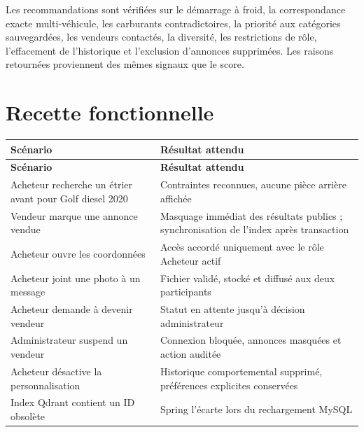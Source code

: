 Les recommandations sont vérifiées sur le démarrage à froid, la correspondance exacte multi-véhicule, les carburants contradictoires, la priorité aux catégories sauvegardées, les vendeurs contactés, la diversité, les restrictions de rôle, l'effacement de l'historique et l'exclusion d'annonces supprimées. Les raisons retournées proviennent des mêmes signaux que le score.


\section{Recette fonctionnelle}

{\small\singlespacing{}
\begin{longtable}{|>{\raggedright\arraybackslash}p{}|>{\raggedright\arraybackslash}p{}|}
\hline
\rowcolor{tablehead} \color{white}\bfseries Scénario & \color{white}\bfseries Résultat attendu \\ \hline
\endfirsthead
\rowcolor{tablehead} \color{white}\bfseries Scénario & \color{white}\bfseries Résultat attendu \\ \hline
\endhead
\hline\endfoot
Acheteur recherche un étrier avant pour Golf diesel 2020 & Contraintes reconnues, aucune pièce arrière affichée \\ \hline
\rowcolor{tablerow} Vendeur marque une annonce vendue & Masquage immédiat des résultats publics ; synchronisation de l'index après transaction \\ \hline
Acheteur ouvre les coordonnées & Accès accordé uniquement avec le rôle Acheteur actif \\ \hline
\rowcolor{tablerow} Acheteur joint une photo à un message & Fichier validé, stocké et diffusé aux deux participants \\ \hline
Acheteur demande à devenir vendeur & Statut en attente jusqu'à décision administrateur \\ \hline
\rowcolor{tablerow} Administrateur suspend un vendeur & Connexion bloquée, annonces masquées et action auditée \\ \hline
Acheteur désactive la personnalisation & Historique comportemental supprimé, préférences explicites conservées \\ \hline
\rowcolor{tablerow} Index Qdrant contient un ID obsolète & Spring l'écarte lors du rechargement MySQL \\ \hline
\end{longtable}
}


